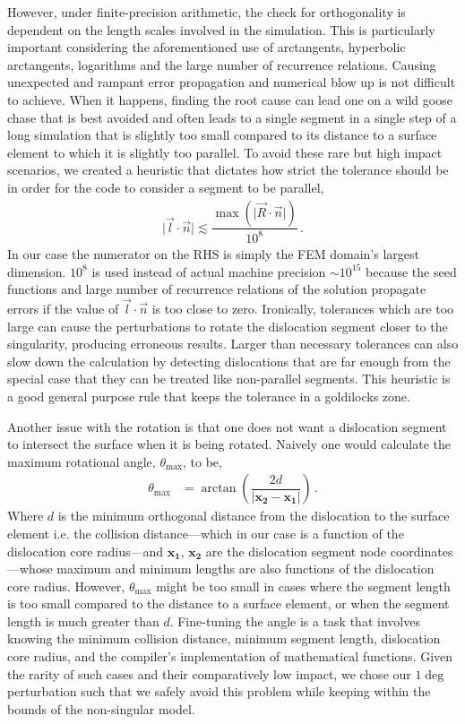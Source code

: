 However, under finite-precision arithmetic, the check for orthogonality is dependent on the length scales involved in the simulation. This is particularly important considering the aforementioned use of arctangents, hyperbolic arctangents, logarithms and the large number of recurrence relations. Causing unexpected and rampant error propagation and numerical blow up is not difficult to achieve. When it happens, finding the root cause can lead one on a wild goose chase that is best avoided and often leads to a single segment in a single step of a long simulation that is slightly too small compared to its distance to a surface element to which it is slightly too parallel. To avoid these rare but high impact scenarios, we created a heuristic that dictates how strict the tolerance should be in order for the code to consider a segment to be parallel,
%
\begin{align}
    \lvert\vec{l}\cdot\vec{n}\rvert \lesssim \dfrac{\max\left(\lvert\vec{R}\cdot\vec{n}\rvert\right)}{10^8}\,.
\end{align}
%
In our case the numerator on the RHS is simply the FEM domain's largest dimension. $10^8$ is used instead of actual machine precision $\sim10^{15}$ because the seed functions and large number of recurrence relations of the solution propagate errors if the value of $\vec{l} \cdot \vec{n}$ is too close to zero. Ironically, tolerances which are too large can cause the perturbations to rotate the dislocation segment closer to the singularity, producing erroneous results. Larger than necessary tolerances can also slow down the calculation by detecting dislocations that are far enough from the special case that they can be treated like non-parallel segments. This heuristic is a good general purpose rule that keeps the tolerance in a goldilocks zone.

Another issue with the rotation is that one does not want a dislocation segment to intersect the surface when it is being rotated. Naively one would calculate the maximum rotational angle, $\theta_{\textrm{max}}$, to be,
%
\begin{align}
    \theta_{\textrm{max}} & = \arctan\left(\dfrac{2 d}{\left\lvert\mathbf{x_2} - \mathbf{x_1}\right\rvert}\right)\,.
\end{align}
%
Where $d$ is the minimum orthogonal distance from the dislocation to the surface element i.e. the collision distance---which in our case is a function of the dislocation core radius---and $\mathbf{x_1},\,\mathbf{x_2}$ are the dislocation segment node coordinates---whose maximum and minimum lengths are also functions of the dislocation core radius. However, $\theta_\textrm{max}$ might be too small in cases where the segment length is too small compared to the distance to a surface element, or when the segment length is much greater than $d$. Fine-tuning the angle is a task that involves knowing the minimum collision distance, minimum segment length, dislocation core radius, and the compiler's implementation of mathematical functions. Given the rarity of such cases and their comparatively low impact, we chose our $1\deg$ perturbation such that we safely avoid this problem while keeping within the bounds of the non-singular model.

